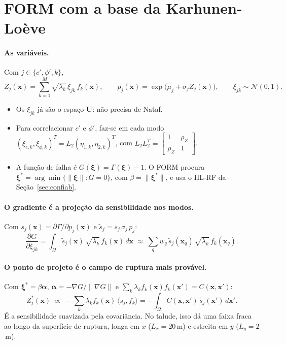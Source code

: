 \section{FORM com a base da Karhunen-Loève}
\label{sec:formkl}

\paragraph{As variáveis.} Com $j \in \{c', \phi', k\}$,
\begin{equation}
  Z_j(\bm x) = \sum_{k=1}^{M} \sqrt{\lambda_k}\,\xi_{jk}\, f_k(\bm x), \qquad
  p_j(\bm x) = \exp\big(\mu_j + \sigma_j Z_j(\bm x)\big), \qquad \xi_{jk} \sim \mathcal N(0,1).
\end{equation}
\begin{itemize}
  \item Os $\xi_{jk}$ já são o espaço $\bm U$: não precisa de Nataf.
  \item Para correlacionar $c'$ e $\phi'$, faz-se em cada modo $(\xi_{c,k}, \xi_{\phi,k})^T = L_2 (\eta_{1,k}, \eta_{2,k})^T$,
    com $L_2L_2^T = \begin{bmatrix}1 & \rho_Z\\ \rho_Z & 1\end{bmatrix}$.
  \item A função de falha é $G(\bm\xi) = \Gamma(\bm\xi) - 1$. O FORM procura
    $\bm\xi^* = \arg\min\{\|\bm\xi\| : G = 0\}$, com $\beta = \|\bm\xi^*\|$, e usa o HL-RF da
    Seção~\ref{sec:confiab}.
\end{itemize}

\paragraph{O gradiente é a projeção da sensibilidade nos modos.} Com $s_j(\bm x) = \partial\Gamma/\partial p_j(\bm x)$ e
$\tilde s_j = s_j\,\sigma_j\,p_j$:
\begin{equation}
  \frac{\partial G}{\partial \xi_{jk}} = \int_\Omega \tilde s_j(\bm x)\,\sqrt{\lambda_k}\, f_k(\bm x)\, d\bm x
  \;\approx\; \sum_q w_q\, \tilde s_j(\bm x_q)\,\sqrt{\lambda_k}\, f_k(\bm x_q).
\end{equation}

\paragraph{O ponto de projeto é o campo de ruptura mais provável.} Com $\bm\xi^* = \beta\bm\alpha$,
$\bm\alpha = -\nabla G/\|\nabla G\|$ e $\sum_k \lambda_k f_k(\bm x) f_k(\bm x') = C(\bm x, \bm x')$:
\begin{equation}
  Z_j^*(\bm x) \;\propto\; -\sum_k \lambda_k f_k(\bm x)\,\langle \tilde s_j, f_k\rangle
  = -\int_\Omega C(\bm x, \bm x')\,\tilde s_j(\bm x')\, d\bm x' .
\end{equation}
É a sensibilidade suavizada pela covariância. No talude, isso dá uma faixa fraca ao longo da superfície de ruptura,
longa em $x$ ($L_x = 20$\,m) e estreita em $y$ ($L_y = 2$\,m).


